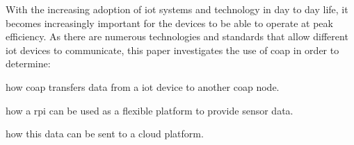 With the increasing adoption of \gls{iot} systems and technology in day to day
life, it becomes increasingly important for the devices to be able to operate
at peak efficiency. As there are numerous technologies and standards that allow
different \gls{iot} devices to communicate, this paper investigates the use
of \gls{coap} in order to determine:
\begin{enumerate*}
    \item how \gls{coap} transfers data from a \gls{iot} device to another \gls{coap} node.
    \item how a \gls{rpi} can be used as a flexible platform to provide sensor data.
    \item how this data can be sent to a cloud platform.
\end{enumerate*}
